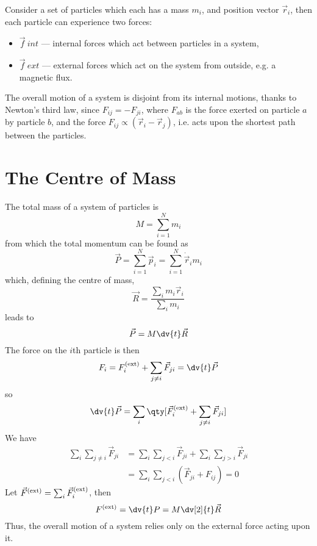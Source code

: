 Consider a set of particles which each has a mass $m_i$, and position
vector $\vec{r}_i$, then each particle can experience two forces:
\begin{itemize}
\item $\vec{f}~{int}$ --- internal forces which act between particles in a system,
\item $\vec{f}~{ext}$ --- external forces which act on the system from
  outside, e.g. a magnetic flux.
\end{itemize}
The overall motion of a system is disjoint from its internal motions,
thanks to Newton's third law, since $F_{ij} = - F_{ji}$, where
$F_{ab}$ is the force exerted on particle $a$ by particle $b$, and the
force $F_{ij} \propto (\vec{r}_i - \vec{r}_j)$, i.e. acts upon the
shortest path between the particles.

\section{The Centre of Mass}
\label{sec:centre-mass}

The total mass of a system of particles is
\begin{equation}
  \label{eq:5}
  M = \sum_{i=1}^N m_i
\end{equation}
from which the total momentum can be found as 
\begin{equation}
  \label{eq:6}
  \vec{P} = \sum_{i=1}^N \vec{p}_i = \sum_{i=1}^N \dot{\vec{r}}_i m_i
\end{equation}
which, defining the centre of mass, 
\[ \vec{R} = \frac{\sum_i m_i \vec{r}_i}{\sum_i m_i}\]
leads to
\begin{equation}
  \label{eq:7}
  \vec{P} = M \dv{t} \vec{R}
\end{equation}
The force on the $i$th particle is then
\begin{equation}
  \label{eq:8}
  F_i = F_i^{\rm (ext)} + \sum_{j \neq i} \vec{F}_{ji} = \dv{t}\vec{P} 
\end{equation}
so
\[ \dv{t}\vec{P} = \sum_i \qty[ \vec{F}_i^{(\rm ext)} + \sum_{j \neq i} \vec{F}_{ji}] \]
We have
\begin{align*} \sum_i \sum_{j \neq i} \vec{F}_{ji} &= \sum_i \sum_{j < i} \vec{F}_{ji} + \sum_i \sum_{j > i} \vec{F}_{ji} \\ &= \sum_i \sum_{j<i} (\vec{F}_{ji} + F_{ij}) = 0
\end{align*}
Let $\vec{F}^{(\rm ext)} = \sum_i \vec{F}_i^{\rm (ext)}$, then
\begin{equation}
  \label{eq:9}
  F^{\rm (ext)} = \dv{t} P = M \dv[2]{t} \vec{R}
\end{equation}
Thus, the overall motion of a system relies only on the external force
acting upon it.

